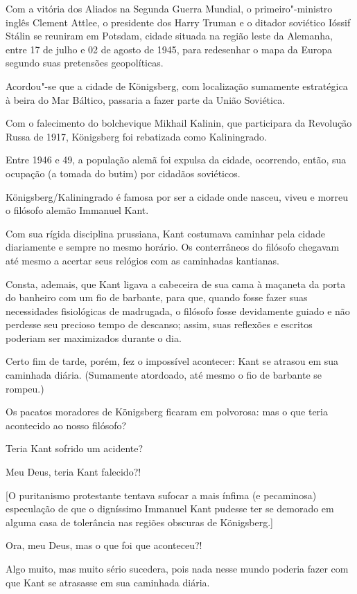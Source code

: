 Com a vitória dos Aliados na Segunda Guerra Mundial, o primeiro"-ministro
inglês Clement Attlee, o presidente dos  Harry Truman e o ditador
soviético Ióssif Stálin se reuniram em Potsdam, cidade situada na região
leste da Alemanha, entre 17 de julho e 02 de agosto de 1945, para
redesenhar o mapa da Europa segundo suas pretensões geopolíticas.

Acordou"-se que a cidade de Königsberg, com localização sumamente
estratégica à beira do Mar Báltico, passaria a fazer parte da União
Soviética.

Com o falecimento do bolchevique Mikhail Kalinin, que participara da
Revolução Russa de 1917, Königsberg foi rebatizada como Kaliningrado.

Entre 1946 e 49, a população alemã foi expulsa da cidade, ocorrendo,
então, sua ocupação (a tomada do butim) por cidadãos soviéticos.

Königsberg/Kaliningrado é famosa por ser a cidade onde nasceu, viveu e
morreu o filósofo alemão Immanuel Kant.

Com sua rígida disciplina prussiana, Kant costumava caminhar pela cidade
diariamente e sempre no mesmo horário. Os conterrâneos do filósofo
chegavam até mesmo a acertar seus relógios com as caminhadas kantianas.

Consta, ademais, que Kant ligava a cabeceira de sua cama à maçaneta da
porta do banheiro com um fio de barbante, para que, quando fosse fazer
suas necessidades fisiológicas de madrugada, o filósofo fosse
devidamente guiado e não perdesse seu precioso tempo de descanso; assim,
suas reflexões e escritos poderiam ser maximizados durante o dia.

Certo fim de tarde, porém, fez o impossível acontecer: Kant se atrasou
em sua caminhada diária. (Sumamente atordoado, até mesmo o fio de
barbante se rompeu.)

Os pacatos moradores de Königsberg ficaram em polvorosa: mas o que teria
acontecido ao nosso filósofo?

Teria Kant sofrido um acidente?

Meu Deus, teria Kant falecido?!

{[}O puritanismo protestante tentava sufocar a mais ínfima (e
pecaminosa) especulação de que o digníssimo Immanuel Kant pudesse ter se
demorado em alguma casa de tolerância nas regiões obscuras de
Königsberg.{]}

Ora, meu Deus, mas o que foi que aconteceu?!

Algo muito, mas muito sério sucedera, pois nada nesse mundo poderia
fazer com que Kant se atrasasse em sua caminhada diária.

